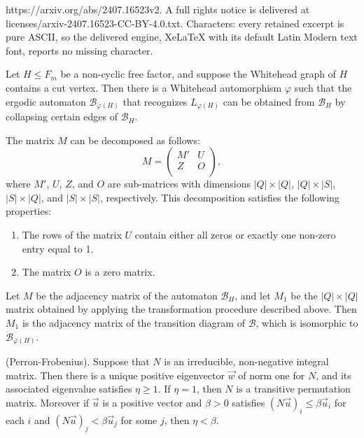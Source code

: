 \documentclass[10pt,a4paper]{amsart}
\newcommand{\B}{\mathcal{B}}
\begin{document}
https://arxiv.org/abs/2407.16523v2. A full rights notice is delivered at licenses/arxiv-2407.16523-CC-BY-4.0.txt. Characters: every retained excerpt is pure ASCII, so the delivered engine, XeLaTeX with its default Latin Modern text font, reports no missing character.
\begin{mythm}\label{thm:B_from_BH}  
Let $H\leq F_m$ be a non-cyclic free factor, and suppose the Whitehead graph of $H$ contains a cut vertex. Then there is a Whitehead automorphism $\varphi$ such that the ergodic automaton $\B_{\varphi(H)}$ that recognizes $L_{\varphi(H)}$ can be obtained from $\B_H$ by collapsing certain edges of $\B_H$.
\end{mythm}

     \begin{mycor}\label{cor:M_partition} The matrix $M$ can be decomposed as follows:
            \begin{equation}
                M = \left(
            \begin{array}{cc}
             M' & U \\
             Z & O \\
            \end{array}
            \right), \label{eqn:decomposition_M}
            \end{equation}
            where $M'$, $U$, $Z$, and $O$ are sub-matrices with dimensions $|Q|\times|Q|$, $|Q|\times|S|$, $|S|\times|Q|$, and $|S|\times|S|$, respectively. This decomposition satisfies the following properties:
            \begin{enumerate}
                \item \label{cor:C}The rows of the matrix $U$ contain either all zeros or exactly one non-zero entry equal to 1.
                \item \label{cor:O}The matrix $O$ is a zero matrix.
            \end{enumerate}
    \end{mycor}

    \begin{mycor}\label{cor:M1_from_M}
    Let $M$ be the adjacency matrix of the automaton $\B_H$, and let $M_1$ be the $|Q|\times |Q|$ matrix obtained by applying the transformation procedure described above. Then $M_1$ is the adjacency matrix of the transition diagram of $\B$, which is isomorphic to $\B_{\varphi(H)}$.
    \end{mycor}

    \begin{mythm}\label{thm:Perron-Frobenius} (Perron-Frobenius). Suppose that $N$ is an irreducible, non-negative integral matrix. Then there is a unique positive eigenvector $\overrightarrow{w}$ of norm one for $N$, and its associated eigenvalue satisfies $\eta \geq 1$. If $\eta = 1$, then $N$ is a transitive permutation matrix. Moreover if $\overrightarrow{u}$ is a positive vector and $\beta > 0$ satisfies 
    $(N\overrightarrow{u})_i \leq \beta\overrightarrow{u}_i$ for each $i$ and 
    $(N\overrightarrow{u})_j < \beta\overrightarrow{u}_j$ for some $j$, then $\eta < \beta.$
    \end{mythm}
\end{document}
